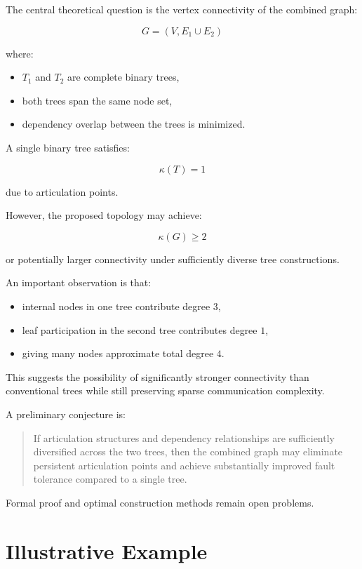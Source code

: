 \documentclass[11pt]{article}
\begin{document}
The central theoretical question is the vertex connectivity of the combined graph:

\[
G=(V,E_1\cup E_2)
\]

where:
\begin{itemize}
    \item \(T_1\) and \(T_2\) are complete binary trees,
    \item both trees span the same node set,
    \item dependency overlap between the trees is minimized.
\end{itemize}

A single binary tree satisfies:

\[
\kappa(T)=1
\]

due to articulation points.

However, the proposed topology may achieve:

\[
\kappa(G)\ge2
\]

or potentially larger connectivity under sufficiently diverse tree constructions.

An important observation is that:
\begin{itemize}
    \item internal nodes in one tree contribute degree \(3\),
    \item leaf participation in the second tree contributes degree \(1\),
    \item giving many nodes approximate total degree \(4\).
\end{itemize}

This suggests the possibility of significantly stronger connectivity than conventional trees while still preserving sparse communication complexity.

A preliminary conjecture is:

\begin{quote}
If articulation structures and dependency relationships are sufficiently diversified across the two trees, then the combined graph may eliminate persistent articulation points and achieve substantially improved fault tolerance compared to a single tree.
\end{quote}

Formal proof and optimal construction methods remain open problems.

\section{Illustrative Example}
\end{document}
